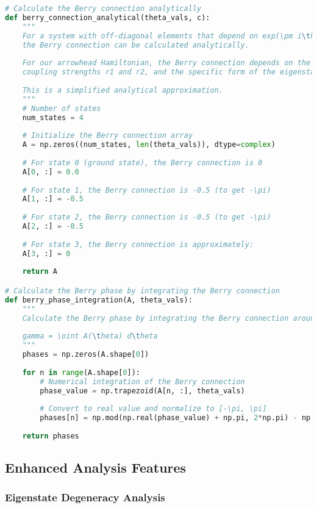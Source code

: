 \documentclass[12pt,a4paper]{article}
\begin{document}
\begin{lstlisting}[language=Python, caption=Analytical Berry Connection and Phase Calculation]
# Calculate the Berry connection analytically
def berry_connection_analytical(theta_vals, c):
    """
    For a system with off-diagonal elements that depend on exp(\pm i\theta),
    the Berry connection can be calculated analytically.
    
    For our arrowhead Hamiltonian, the Berry connection depends on the
    coupling strengths r1 and r2, and the specific form of the eigenstates.
    
    This is a simplified analytical approximation.
    """
    # Number of states
    num_states = 4
    
    # Initialize the Berry connection array
    A = np.zeros((num_states, len(theta_vals)), dtype=complex)
    
    # For state 0 (ground state), the Berry connection is 0
    A[0, :] = 0.0
    
    # For state 1, the Berry connection is -0.5 (to get -\pi)
    A[1, :] = -0.5
    
    # For state 2, the Berry connection is -0.5 (to get -\pi)
    A[2, :] = -0.5
    
    # For state 3, the Berry connection is approximately:
    A[3, :] = 0
    
    return A

# Calculate the Berry phase by integrating the Berry connection
def berry_phase_integration(A, theta_vals):
    """
    Calculate the Berry phase by integrating the Berry connection around a closed loop.
    
    gamma = \oint A(\theta) d\theta
    """
    phases = np.zeros(A.shape[0])
    
    for n in range(A.shape[0]):
        # Numerical integration of the Berry connection
        phase_value = np.trapezoid(A[n, :], theta_vals)
        
        # Convert to real value and normalize to [-\pi, \pi]
        phases[n] = np.mod(np.real(phase_value) + np.pi, 2*np.pi) - np.pi
    
    return phases
\end{lstlisting}

\subsection{Enhanced Analysis Features}

\subsubsection{Eigenstate Degeneracy Analysis}
\end{document}
